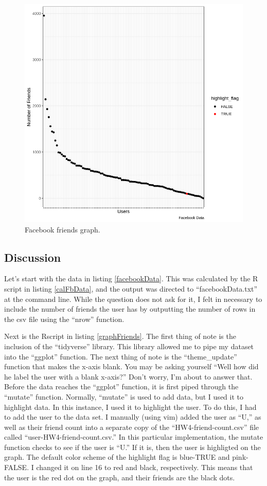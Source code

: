 \documentclass[12pt]{article}
\begin{document}
\begin{figure}[h]
    \centering
    \includegraphics[width=\textwidth] {facebookGraph.png}
    \caption{Facebook friends graph.}
    \label{friendsGraph}
\end{figure}

\subsection*{Discussion}
Let's start with the data in listing \ref{facebookData}.  This was calculated by the R script in listing \ref{calFbData}, and the output was directed to ``facebookData.txt'' at the command line.  While the question does not ask for it, I felt in necessary to include the number of friends the user has by outputting the number of rows in the csv file using the ``nrow'' function.

Next is the Rscript in listing \ref{graphFriends}.  The first thing of note is the inclusion of the ``tidyverse'' library.  This library allowed me to pipe my dataset into the ``ggplot'' function.  The next thing of note is the ``theme\_update'' function that makes the x-axis blank.  You may be asking yourself ``Well how did he label the user with a blank x-axis?''  Don't worry, I'm about to answer that.  Before the data reaches the ``ggplot'' function, it is first piped through the ``mutate'' function.  Normally, ``mutate'' is used to add data, but I used it to highlight data.  In this instance, I used it to highlight the user.  To do this, I had to add the user to the data set.  I manually (using vim) added the user as ``U,'' as well as their friend count into a separate copy of the ``HW4-friend-count.csv'' file called ``user-HW4-friend-count.csv.''  In this particular implementation, the mutate function checks to see if the user is ``U.''  If it is, then the user is highligted on the graph.  The default color scheme of the highlight flag is blue-TRUE and pink-FALSE.  I changed it on line 16 to red and black, respectively.  This means that the user is the red dot on the graph, and their friends are the black dots.
\end{document}
